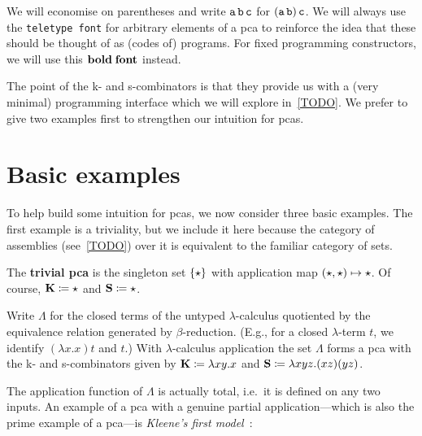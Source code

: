 \begin{notation}
  We will economise on parentheses and write \(\operatorname{\mathtt{a}}\operatorname{\mathtt{b}}\operatorname{\mathtt{c}}\) for
  \((\operatorname{\mathtt{a}}\operatorname{\mathtt{b}})\operatorname{\mathtt{c}}\).
  We will always use the \texttt{teletype font} for arbitrary elements of a pca
  to reinforce the idea that these should be thought of as (codes of) programs.
  For fixed programming constructors, we will use this \(\operatorname{\mathbf{bold\; font}}\)
  instead.
\end{notation}

The point of the k- and s-combinators is that they provide us with a (very
minimal) programming interface which we will explore in~\cref{TODO}.
%
We prefer to give two examples first to strengthen our intuition for pcas.

\section{Basic examples}

To help build some intuition for pcas, we now consider three basic examples. The
first example is a triviality, but we include it here because the category of
assemblies (see~\cref{TODO}) over it is equivalent to the familiar category of
sets.

\begin{example}
  The \textbf{trivial pca} is the singleton set \(\{\star\}\) with
  application map \((\star,\star) \mapsto \star\).
  Of course, \(\operatorname{\mathbf{K}} \coloneq \star\) and \(\operatorname{\mathbf{S}} \coloneq \star\).
\end{example}

\begin{example}
  Write \(\Lambda\) for the closed terms of the untyped \(\lambda\)-calculus
  quotiented by the equivalence relation generated by
  \(\beta\)-reduction. (E.g., for a closed \(\lambda\)-term \(t\), we identify
  \((\lambda{x}.{x})t\) and \(t\).)
  With \(\lambda\)-calculus application the set \(\Lambda\) forms a pca with the
  k- and s-combinators given by \(\operatorname{\mathbf{K}} \coloneq \lambda{xy}.x\) and
  \(\operatorname{\mathbf{S}} \coloneq \lambda{xyz}.(xz)(yz)\).
\end{example}

The application function of \(\Lambda\) is actually total, i.e.\ it is defined
on any two inputs. An example of a pca with a genuine partial application---which
is also the prime example of a pca---is \emph{Kleene's first model}~\cite{Kleene1945}:

